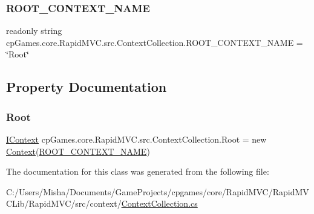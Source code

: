 \subsubsection{\texorpdfstring{ROOT\_CONTEXT\_NAME}{ROOT\_CONTEXT\_NAME}}
{\footnotesize\ttfamily readonly string cp\+Games.\+core.\+Rapid\+M\+V\+C.\+src.\+Context\+Collection.\+R\+O\+O\+T\+\_\+\+C\+O\+N\+T\+E\+X\+T\+\_\+\+N\+A\+ME = \char`\"{}Root\char`\"{}\hspace{0.3cm}{\ttfamily [static]}}



\subsection{Property Documentation}
\mbox{\label{classcp_games_1_1core_1_1_rapid_m_v_c_1_1src_1_1_context_collection_a5cee2cbf3726c48e4195a1fd9d4616be}} 
\subsubsection{\texorpdfstring{Root}{Root}}
{\footnotesize\ttfamily \mbox{\hyperlink{interfacecp_games_1_1core_1_1_rapid_m_v_c_1_1_i_context}{I\+Context}} cp\+Games.\+core.\+Rapid\+M\+V\+C.\+src.\+Context\+Collection.\+Root = new \mbox{\hyperlink{classcp_games_1_1core_1_1_rapid_m_v_c_1_1src_1_1_context}{Context}}(\mbox{\hyperlink{classcp_games_1_1core_1_1_rapid_m_v_c_1_1src_1_1_context_collection_a0f80312ff7ecedc098b2ee8e2c18d588}{R\+O\+O\+T\+\_\+\+C\+O\+N\+T\+E\+X\+T\+\_\+\+N\+A\+ME}})\hspace{0.3cm}{\ttfamily [get]}}



The documentation for this class was generated from the following file\+:\begin{DoxyCompactItemize}
\item 
C\+:/\+Users/\+Misha/\+Documents/\+Game\+Projects/cpgames/core/\+Rapid\+M\+V\+C/\+Rapid\+M\+V\+C\+Lib/\+Rapid\+M\+V\+C/src/context/\mbox{\hyperlink{_context_collection_8cs}{Context\+Collection.\+cs}}\end{DoxyCompactItemize}
